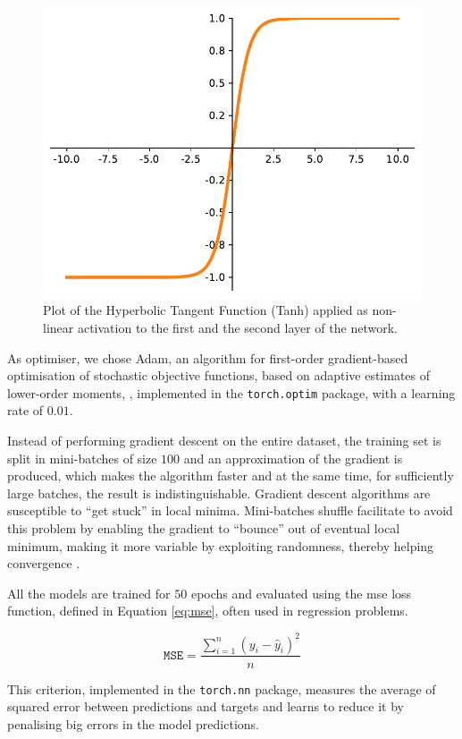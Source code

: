 \begin{figure}[!htb]
	\centering
	\includegraphics[width=.45\textwidth]{contents/images/tanh2}%
	\caption[Plot of the Tanh activation function.]{Plot of the Hyperbolic 
		Tangent Function (Tanh) applied as non-linear activation to the first and the 
		second layer of the network.}
	\label{fig:tanh}
\end{figure}

As optimiser, we chose Adam, {an algorithm for first-order gradient-based 
optimisation of stochastic objective functions, based on adaptive estimates of 
lower-order moments}, \cite[see][]{kingma2014adam, 
loshchilov2017decoupled}, implemented in the \texttt{torch.optim} package, 
with a learning rate of $0.01$. 

Instead of performing gradient descent on the entire dataset, the training set is 
split in mini-batches of size $100$ and an approximation of the gradient is 
produced, which makes the algorithm faster and at the same time, for sufficiently 
large batches, the result is indistinguishable.
Gradient descent algorithms are susceptible to ``get stuck'' in local minima.
Mini-batches shuffle facilitate to avoid this problem by enabling the gradient to 
``bounce'' out of eventual local minimum, making it more variable by exploiting 
randomness, thereby helping convergence \cite[][]{meng2019convergence}.

All the models are trained for $50$ epochs and evaluated using the \gls{mse} loss 
function, defined in Equation \ref{eq:mse}, often used in regression problems. 
\begin{Equation}[!htb]
	\centering
	\begin{equation}
	\mathtt{MSE} = \frac{\sum_{i=1}^n (y_i-\hat y_i)^2}{n}
	\end{equation}
	\caption{Mean Squared Error (\gls{mse}) loss function.}
	\label{eq:mse}
\end{Equation}
This criterion, implemented in the \texttt{torch.nn} package, measures the 
average of squared error between predictions and targets and learns to reduce it 
by penalising big errors in the model predictions.

